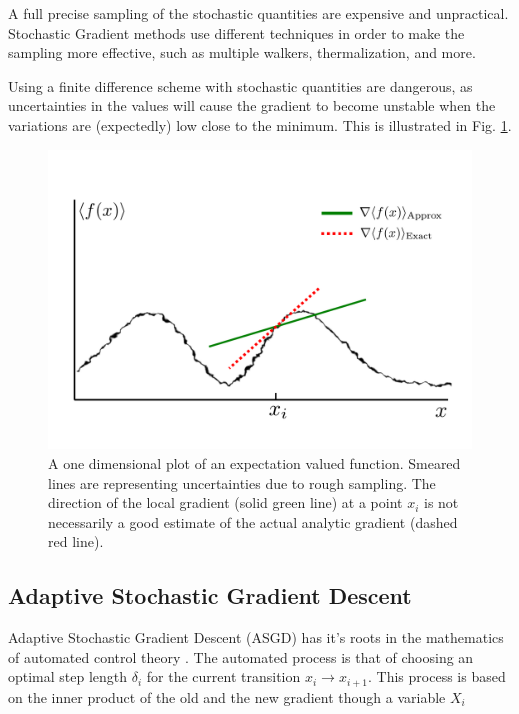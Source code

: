 A full precise sampling of the stochastic quantities are expensive and unpractical. Stochastic Gradient methods use different techniques in order to make the sampling more effective, such as multiple walkers, thermalization, and more. 

Using a finite difference scheme with stochastic quantities are dangerous, as uncertainties in the values will cause the gradient to become unstable when the variations are (expectedly) low close to the minimum. This is illustrated in Fig. \ref{fig:sSGD}.

\begin{figure}
 \begin{center}
  \includegraphics[scale=0.3]{../Graphics/SSGD.pdf}
  \caption{A one dimensional plot of an expectation valued function. Smeared lines are representing uncertainties due to rough sampling. The direction of the local gradient (solid green line) at a point $x_i$ is not necessarily a good estimate of the actual analytic gradient (dashed red line).}
  \label{fig:sSGD}
 \end{center}
\end{figure}


\subsection{Adaptive Stochastic Gradient Descent}

Adaptive Stochastic Gradient Descent (ASGD) has it's roots in the mathematics of automated control theory \cite{ASGD_MB}. The automated process is that of choosing an optimal step length $\delta_i$ for the current transition $x_{i}\to x_{i+1}$. This process is based on the inner product of the old and the new gradient though a variable $X_i$


